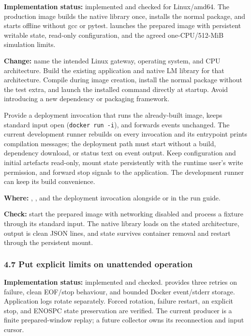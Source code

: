 \documentclass[11pt,a4paper]{article}
\begin{document}
\textbf{Implementation status:} implemented and checked for Linux/amd64. The
production image builds the native library once, installs the normal package,
and starts offline without gcc or pytest.  launches the
prepared image with persistent writable state, read-only configuration, and the
agreed one-CPU/512-MiB simulation limits.

\textbf{Change:} name the intended Linux gateway, operating system, and CPU
architecture. Build the existing application and native LM library for that
architecture. Compile during image creation, install the normal package without
the test extra, and launch the installed command directly at startup. Avoid
introducing a new dependency or packaging framework.

Provide a deployment invocation that runs the already-built image, keeps
standard input open (\texttt{docker run -i}), and forwards events unchanged.
The current development runner rebuilds on every invocation and its entrypoint
prints compilation messages; the deployment path must start without a build,
dependency download, or status text on event output. Keep configuration and
initial artefacts read-only, mount state persistently with the runtime user's
write permission, and forward stop signals to the application. The development
runner can keep its build convenience.

\textbf{Where:} , , and the
deployment invocation alongside  or in the run guide.

\textbf{Check:} start the prepared image with networking disabled and process a
fixture through its standard input. The native library loads on the stated
architecture, output is clean JSON lines, and state survives container removal
and restart through the persistent mount.

\subsubsection*{4.7 Put explicit limits on unattended operation}

\textbf{Implementation status:} implemented and checked. 
provides three retries on failure, clean EOF/stop behaviour, and bounded Docker
event/stderr storage. Application logs rotate separately. Forced rotation,
failure restart, an explicit stop, and ENOSPC state preservation are verified.
The current producer is a finite prepared-window replay; a future collector owns
its reconnection and input cursor.
\end{document}
